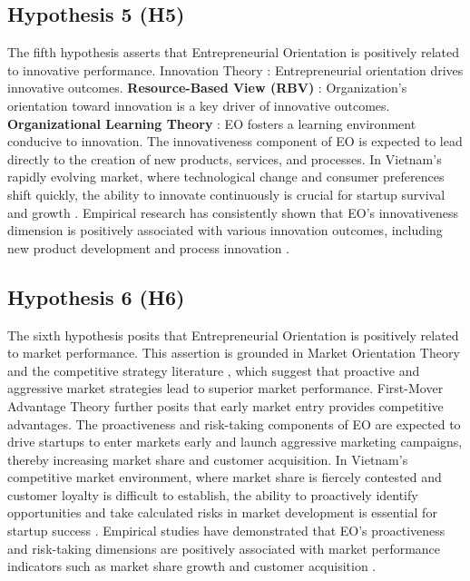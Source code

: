 \documentclass[../Main.tex]{subfiles}
\begin{document}
    \subsection{Hypothesis 5 (H5)}
    The fifth hypothesis asserts that Entrepreneurial Orientation is positively related to innovative performance. Innovation Theory \cite{schumpeter1934theory}: Entrepreneurial orientation drives innovative outcomes. 
    \textbf{Resource-Based View (RBV)} \cite{barney1991firm}: Organization's orientation toward innovation is a key driver of innovative outcomes. 
    \textbf{Organizational Learning Theory} \cite{argyris1978organizational}: EO fosters a learning environment conducive to innovation. The innovativeness component of EO is expected to lead directly to the creation of new products, services, and processes. In Vietnam's rapidly evolving market, where technological change and consumer preferences shift quickly, the ability to innovate continuously is crucial for startup survival and growth \cite{vietnam_innovation_report_2024}. Empirical research has consistently shown that EO's innovativeness dimension is positively associated with various innovation outcomes, including new product development and process innovation \cite{lumpkin1996clarifying, wiklund2003knowledge}.

    \subsection{Hypothesis 6 (H6)}
    The sixth hypothesis posits that Entrepreneurial Orientation is positively related to market performance. This assertion is grounded in Market Orientation Theory \cite{narver1990effect} and the competitive strategy literature \cite{porter1980competitive}, which suggest that proactive and aggressive market strategies lead to superior market performance. First-Mover Advantage Theory \cite{lieberman1988first} further posits that early market entry provides competitive advantages. The proactiveness and risk-taking components of EO are expected to drive startups to enter markets early and launch aggressive marketing campaigns, thereby increasing market share and customer acquisition. In Vietnam's competitive market environment, where market share is fiercely contested and customer loyalty is difficult to establish, the ability to proactively identify opportunities and take calculated risks in market development is essential for startup success \cite{vietnam_innovation_report_2024}. Empirical studies have demonstrated that EO's proactiveness and risk-taking dimensions are positively associated with market performance indicators such as market share growth and customer acquisition \cite{lumpkin2001linking, wiklund2005entrepreneurial}.
\end{document}

